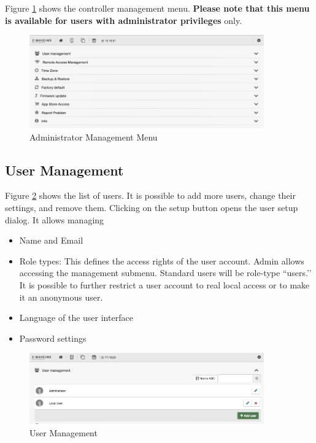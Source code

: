 Figure \ref{shui91} shows the controller management menu. \textbf{Please note that this 
menu is available for users with administrator privileges} only.

\begin{figure}
\begin{center}
\includegraphics[width=0.9\textwidth]{pngs/cap4/shui91.png}
\caption{Administrator Management Menu}
\label{shui91}
\end{center}
\end{figure}

\subsection{User Management}
\label{cap4:user_management}

Figure \ref{shui71} shows the list of users. It is possible to add more users, change 
their settings, and remove them. Clicking on the setup button opens the user setup dialog. 
It allows managing

\begin{itemize}
\item Name and Email
\item Role types: This defines the access rights of the user account. Admin allows 
accessing the management submenu. Standard users will be role-type ``users.’’ It is 
possible to further restrict a user account to real local access or to make it an 
anonymous user.
\item Language of the user interface
\item Password settings
\end{itemize}

\begin{figure}
\begin{center}
\includegraphics[width=0.9\textwidth]{pngs/cap4/shui71.png}
\caption{User Management}
\label{shui71}
\end{center}
\end{figure}

